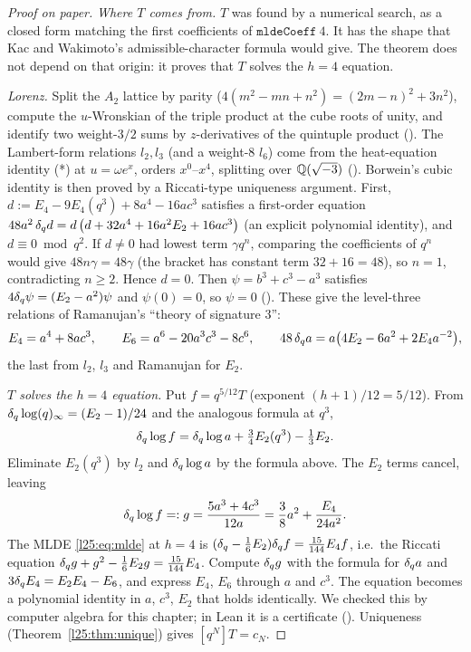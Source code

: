 \begin{proof}[Proof on paper]
\emph{Where $T$ comes from.} $T$ was found by a numerical search, as a closed form matching the first coefficients of
$\mathtt{mldeCoeff}\ 4$. It has the shape that Kac and Wakimoto's admissible-character formula would give. The theorem
does not depend on that origin: it proves that $T$ solves the $h=4$ equation.

\emph{Lorenz.} Split the $A_2$ lattice by parity ($4(m^2-mn+n^2)=(2m-n)^2+3n^2$), compute the $u$-Wronskian of the triple
product at the cube roots of unity, and identify two weight-$3/2$ sums by $z$-derivatives of the quintuple product
(). The Lambert-form relations $l_2,l_3$ (and a weight-8 $l_6$) come from the heat-equation identity
(*) at $u=\omega e^x$, orders $x^0$--$x^4$, splitting over ${\mathbb{Q}}(\sqrt{-3})$ (). Borwein's
cubic identity is then proved by a Riccati-type uniqueness argument. First, $d:=E_4-9E_4(q^3)+8a^4-16ac^3$ satisfies a
first-order equation $48a^2\,\delta_q d=d\,\big(d+32a^4+16a^2E_2+16ac^3\big)$ (an explicit polynomial identity),
and $d\equiv0\bmod q^2$. If $d\ne0$ had lowest term $\gamma q^n$, comparing the coefficients of $q^n$ would give
$48n\gamma=48\gamma$ (the bracket has constant term $32+16=48$), so $n=1$, contradicting $n\ge2$. Hence $d=0$. Then
$\psi=b^3+c^3-a^3$ satisfies $4\delta_q\psi=(E_2-a^2)\psi$ and $\psi(0)=0$, so $\psi=0$ ().
These give the level-three relations of Ramanujan's ``theory of signature 3'':
\begin{equation*}
E_4=a^4+8ac^3,\qquad E_6=a^6-20a^3c^3-8c^6,\qquad 48\,\delta_q a=a\big(4E_2-6a^2+2E_4a^{-2}\big),
\end{equation*}
the last from $l_2$, $l_3$ and Ramanujan for $E_2$.

\emph{$T$ solves the $h=4$ equation.} Put $f=q^{5/12}T$ (exponent $(h+1)/12=5/12$). From
$\delta_q\log(q)_\infty=(E_2-1)/24$ and the analogous formula at $q^3$,
\begin{equation*}
\delta_q\log f=\delta_q\log a+\tfrac34E_2(q^3)-\tfrac13E_2 .
\end{equation*}
Eliminate $E_2(q^3)$ by $l_2$ and $\delta_q\log a$ by the formula above. The $E_2$ terms cancel, leaving
\begin{equation*}
\delta_q\log f=:g=\frac{5a^3+4c^3}{12a}=\frac38a^2+\frac{E_4}{24a^2}.
\end{equation*}
The MLDE \eqref{l25:eq:mlde} at $h=4$ is $(\delta_q-\frac16E_2)\delta_q f=\frac{15}{144}E_4f$, i.e.\ the Riccati
equation $\delta_q g+g^2-\frac16E_2g=\frac{15}{144}E_4$. Compute $\delta_q g$ with the formula for
$\delta_q a$ and $3\delta_q E_4=E_2E_4-E_6$, and express $E_4$, $E_6$ through $a$ and $c^3$. The equation
becomes a polynomial identity in $a$, $c^3$, $E_2$ that holds identically. We checked this by computer algebra for this
chapter; in Lean it is a  certificate (). Uniqueness
(Theorem~\ref{l25:thm:unique}) gives $[q^N]T=c_N$.
\end{proof}
